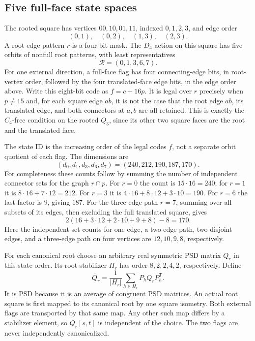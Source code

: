 \documentclass[11pt]{article}
\begin{document}
\subsection{Five full-face state spaces}

The rooted square has vertices \(00,10,01,11\), indexed \(0,1,2,3\), and
edge order
\[
 (0,1),\quad(0,2),\quad(1,3),\quad(2,3).
\]
A root edge pattern \(r\) is a four-bit mask.  The \(D_4\) action on this
square has five orbits of nonfull root patterns, with least representatives
\[
 \mathcal R=(0,1,3,6,7).
\]
For one external direction, a full-face flag has four connecting-edge
bits, in root-vertex order, followed by the four translated-face edge bits,
in the edge order above.  Write this eight-bit code as \(f=c+16p\).
It is legal over \(r\) precisely when \(p\ne15\) and, for each square edge
\(ab\), it is not the case that the root edge \(ab\), its translated edge,
and both connectors at \(a,b\) are all retained.
This is exactly the \(C_4\)-free condition on the rooted \(Q_3\), since
its other two square faces are the root and the translated face.

The state ID is the increasing order of the legal codes \(f\), not a
separate orbit quotient of each flag.  The dimensions are
\[
 (d_0,d_1,d_3,d_6,d_7)=(240,212,190,187,170).
\]
For completeness these counts follow by summing the number of independent
connector sets for the graph \(r\cap p\).  For \(r=0\) the count is
\(15\cdot16=240\); for \(r=1\) it is \(8\cdot16+7\cdot12=212\).
For \(r=3\) it is \(4\cdot16+8\cdot12+3\cdot10=190\).
For \(r=6\) the last factor is \(9\), giving \(187\).
For the three-edge path \(r=7\), summing over all subsets of its edges,
then excluding the full translated square, gives
\[
 2(16+3\cdot12+2\cdot10+9+8)-8=170.
\]
Here the independent-set counts for one edge, a two-edge path, two
disjoint edges, and a three-edge path on four vertices are
\(12,10,9,8\), respectively.

For each canonical root choose an arbitrary real symmetric PSD matrix
\(Q_r\) in this state order.  Its root stabilizer \(H_r\) has order
\(8,2,2,4,2\), respectively.  Define
\[
 \overline Q_r=\frac1{|H_r|}\sum_{h\in H_r}P_hQ_rP_h^{\mathsf T}.
 \tag{G01.1}
\]
It is PSD because it is an average of congruent PSD matrices.
An actual root square is first mapped to its canonical root by one
square isometry.  Both external flags are transported by that same map.
Any other such map differs by a stabilizer element, so
\(\overline Q_r[s,t]\) is independent of the choice.  The two flags
are never independently canonicalized.
\end{document}
